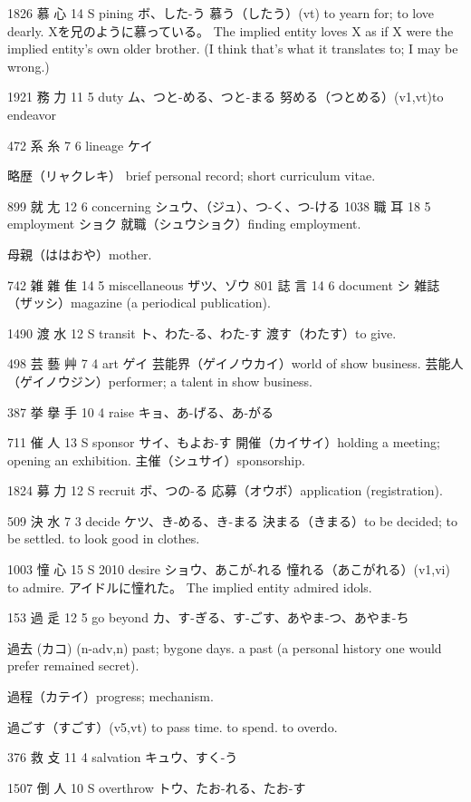 1826	慕		心	14	S		pining	ボ、した-う
慕う（したう）(vt) to yearn for; to love dearly.
Xを兄のように慕っている。
The implied entity loves X as if
X were the implied entity's own older brother.
(I think that's what it translates to; I may be wrong.)

1921	務		力	11	5		duty	ム、つと-める、つと-まる
努める（つとめる）(v1,vt)to endeavor

472	系		糸	7	6		lineage	ケイ

略歴（リャクレキ）
brief personal record;
short curriculum vitae.

899	就		尢	12	6		concerning	シュウ、（ジュ）、つ-く、つ-ける
1038	職		耳	18	5		employment	ショク
就職（シュウショク）finding employment.

母親（ははおや）mother.

742	雑	雜	隹	14	5		miscellaneous	ザツ、ゾウ
801	誌		言	14	6		document	シ
雑誌（ザッシ）magazine (a periodical publication).

1490	渡		水	12	S		transit	ト、わた-る、わた-す
渡す（わたす）to give.

498	芸	藝	艸	7	4		art	ゲイ
芸能界（ゲイノウカイ）world of show business.
芸能人（ゲイノウジン）performer; a talent in show business.

387	挙	擧	手	10	4		raise	キョ、あ-げる、あ-がる

711	催		人	13	S		sponsor	サイ、もよお-す
開催（カイサイ）holding a meeting; opening an exhibition.
主催（シュサイ）sponsorship.

1824	募		力	12	S		recruit	ボ、つの-る
応募（オウボ）application (registration).

509	決		水	7	3		decide	ケツ、き-める、き-まる
決まる（きまる）to be decided; to be settled. to look good in clothes.

1003	憧		心	15	S	2010	desire	ショウ、あこが-れる
憧れる（あこがれる）(v1,vi) to admire.
アイドルに憧れた。
The implied entity admired idols.

153	過		辵	12	5		go beyond	カ、す-ぎる、す-ごす、あやま-つ、あやま-ち

過去 (カコ) (n-adv,n)
past; bygone days.
a past (a personal history one would prefer remained secret).

過程（カテイ）progress; mechanism.

過ごす（すごす）(v5,vt) to pass time. to spend. to overdo.

376	救		攴	11	4		salvation	キュウ、すく-う

1507	倒		人	10	S		overthrow	トウ、たお-れる、たお-す

